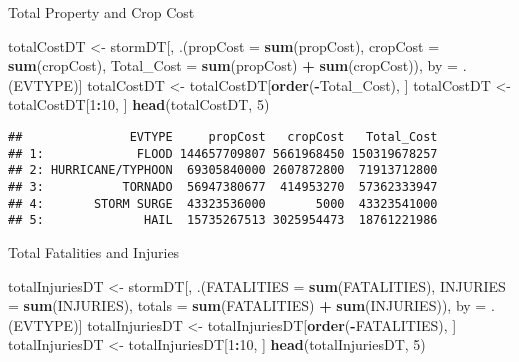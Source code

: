 \documentclass[]{article}
\newenvironment{Shaded}{\begin{snugshade}}{\end{snugshade}}
\newcommand{\DataTypeTok}[1]{\textcolor[rgb]{0.13,0.29,0.53}{#1}}
\newcommand{\DecValTok}[1]{\textcolor[rgb]{0.00,0.00,0.81}{#1}}
\newcommand{\KeywordTok}[1]{\textcolor[rgb]{0.13,0.29,0.53}{\textbf{#1}}}
\newcommand{\NormalTok}[1]{#1}
\newcommand{\OperatorTok}[1]{\textcolor[rgb]{0.81,0.36,0.00}{\textbf{#1}}}
\newcommand{\StringTok}[1]{\textcolor[rgb]{0.31,0.60,0.02}{#1}}
\begin{document}
Total Property and Crop Cost

\begin{Shaded}
\begin{Highlighting}[]
\NormalTok{totalCostDT <-}\StringTok{ }\NormalTok{stormDT[, .(}\DataTypeTok{propCost =} \KeywordTok{sum}\NormalTok{(propCost), }\DataTypeTok{cropCost =} \KeywordTok{sum}\NormalTok{(cropCost), }\DataTypeTok{Total_Cost =} \KeywordTok{sum}\NormalTok{(propCost) }\OperatorTok{+}\StringTok{ }\KeywordTok{sum}\NormalTok{(cropCost)), by =}\StringTok{ }\NormalTok{.(EVTYPE)]}
\NormalTok{totalCostDT <-}\StringTok{ }\NormalTok{totalCostDT[}\KeywordTok{order}\NormalTok{(}\OperatorTok{-}\NormalTok{Total_Cost), ]}
\NormalTok{totalCostDT <-}\StringTok{ }\NormalTok{totalCostDT[}\DecValTok{1}\OperatorTok{:}\DecValTok{10}\NormalTok{, ]}
\KeywordTok{head}\NormalTok{(totalCostDT, }\DecValTok{5}\NormalTok{)}
\end{Highlighting}
\end{Shaded}

\begin{verbatim}
##               EVTYPE     propCost   cropCost   Total_Cost
## 1:             FLOOD 144657709807 5661968450 150319678257
## 2: HURRICANE/TYPHOON  69305840000 2607872800  71913712800
## 3:           TORNADO  56947380677  414953270  57362333947
## 4:       STORM SURGE  43323536000       5000  43323541000
## 5:              HAIL  15735267513 3025954473  18761221986
\end{verbatim}

Total Fatalities and Injuries

\begin{Shaded}
\begin{Highlighting}[]
\NormalTok{totalInjuriesDT <-}\StringTok{ }\NormalTok{stormDT[, .(}\DataTypeTok{FATALITIES =} \KeywordTok{sum}\NormalTok{(FATALITIES), }\DataTypeTok{INJURIES =} \KeywordTok{sum}\NormalTok{(INJURIES), }\DataTypeTok{totals =} \KeywordTok{sum}\NormalTok{(FATALITIES) }\OperatorTok{+}\StringTok{ }\KeywordTok{sum}\NormalTok{(INJURIES)), by =}\StringTok{ }\NormalTok{.(EVTYPE)]}
\NormalTok{totalInjuriesDT <-}\StringTok{ }\NormalTok{totalInjuriesDT[}\KeywordTok{order}\NormalTok{(}\OperatorTok{-}\NormalTok{FATALITIES), ]}
\NormalTok{totalInjuriesDT <-}\StringTok{ }\NormalTok{totalInjuriesDT[}\DecValTok{1}\OperatorTok{:}\DecValTok{10}\NormalTok{, ]}
\KeywordTok{head}\NormalTok{(totalInjuriesDT, }\DecValTok{5}\NormalTok{)}
\end{Highlighting}
\end{Shaded}
\end{document}
